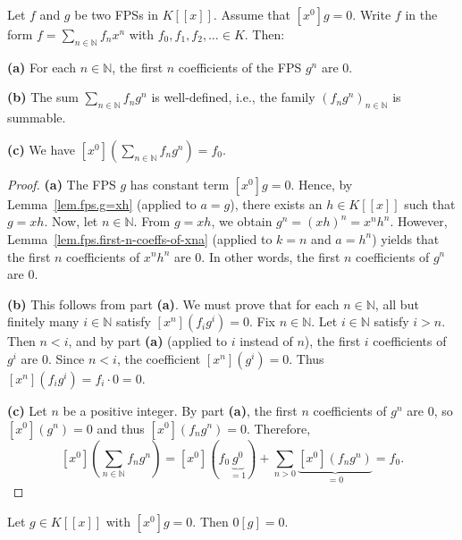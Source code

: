 \begin{proposition}
\label{prop.fps.subs.wd}
\leantarget
\leanok
Let $f$ and $g$ be two FPSs in $K[[x]]$. Assume that $[x^0]g = 0$.
Write $f$ in the form $f = \sum_{n \in \mathbb{N}} f_n x^n$ with
$f_0, f_1, f_2, \ldots \in K$. Then:

\textbf{(a)} For each $n \in \mathbb{N}$, the first $n$ coefficients of the
FPS $g^n$ are $0$.

\textbf{(b)} The sum $\sum_{n \in \mathbb{N}} f_n g^n$ is well-defined, i.e.,
the family $(f_n g^n)_{n \in \mathbb{N}}$ is summable.

\textbf{(c)} We have $[x^0](\sum_{n \in \mathbb{N}} f_n g^n) = f_0$.
\end{proposition}

\begin{proof}
\textbf{(a)} The FPS $g$ has constant term $[x^0]g = 0$. Hence, by
Lemma~\ref{lem.fps.g=xh} (applied to $a = g$), there exists an
$h \in K[[x]]$ such that $g = xh$. Now, let $n \in \mathbb{N}$. From
$g = xh$, we obtain $g^n = (xh)^n = x^n h^n$. However,
Lemma~\ref{lem.fps.first-n-coeffs-of-xna} (applied to $k = n$ and
$a = h^n$) yields that the first $n$ coefficients of $x^n h^n$ are $0$.
In other words, the first $n$ coefficients of $g^n$ are $0$.

\textbf{(b)} This follows from part \textbf{(a)}. We must prove that for each
$n \in \mathbb{N}$, all but finitely many $i \in \mathbb{N}$ satisfy
$[x^n](f_i g^i) = 0$. Fix $n \in \mathbb{N}$. Let $i \in \mathbb{N}$
satisfy $i > n$. Then $n < i$, and by part \textbf{(a)} (applied to $i$
instead of $n$), the first $i$ coefficients of $g^i$ are $0$. Since $n < i$,
the coefficient $[x^n](g^i) = 0$. Thus $[x^n](f_i g^i) = f_i \cdot 0 = 0$.

\textbf{(c)} Let $n$ be a positive integer. By part \textbf{(a)}, the first
$n$ coefficients of $g^n$ are $0$, so $[x^0](g^n) = 0$ and thus
$[x^0](f_n g^n) = 0$. Therefore,
\[
[x^0]\left(\sum_{n \in \mathbb{N}} f_n g^n\right)
= [x^0](f_0 \underbrace{g^0}_{= 1}) + \sum_{n > 0} \underbrace{[x^0](f_n g^n)}_{= 0}
= f_0.
\]
\end{proof}

\begin{lemma}
\label{lem.fps.subs.zero}
\leanhelper
\leanok
Let $g \in K[[x]]$ with $[x^0]g = 0$. Then $0[g] = 0$.
\end{lemma}

